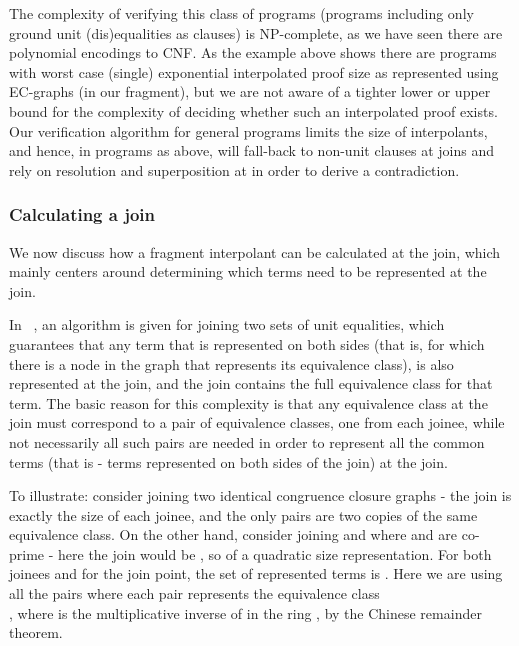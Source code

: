 The complexity of verifying this class of programs (programs including only ground unit (dis)equalities as clauses) is NP-complete, as we have seen there are polynomial encodings to CNF.
As the example above shows there are programs with worst case (single) exponential interpolated proof size as represented using EC-graphs (in our fragment), but we are not aware of a tighter lower or upper bound for the complexity of deciding whether such an interpolated proof exists. Our verification algorithm for general programs limits the size of interpolants, and hence, in programs as above, 
will fall-back to non-unit clauses at joins and rely on resolution and superposition at  in order to derive a contradiction.

\subsubsection*{Calculating a join}
We now discuss how a fragment interpolant can be calculated at the join, which mainly centers around determining which terms need to be represented at the join.

In ~\cite{GulwaniTiwariNecula04}, an  algorithm is given for joining two sets of unit equalities, which guarantees that any term that is represented on both sides (that is, for which there is a node in the graph that represents its equivalence class), is also represented at the join, and the join contains the full equivalence class for that term.
The basic reason for this complexity is that any equivalence class at the join must correspond to a pair of equivalence classes, one from each joinee, while not necessarily all such pairs are needed in order to represent all the common terms (that is - terms represented on both sides of the join) at the join.

To illustrate: consider joining two identical congruence closure graphs - the join is exactly the size of each joinee, and the only pairs are two copies of the same equivalence class.
On the other hand, consider joining   and  where  and  are co-prime - here the join would be , so of a quadratic size representation. 
For both joinees and for the join point, the set of represented terms is .
Here we are using all the pairs where each pair  represents the equivalence class \\
, 
where  is the multiplicative inverse of  in the ring , by the Chinese remainder theorem.

